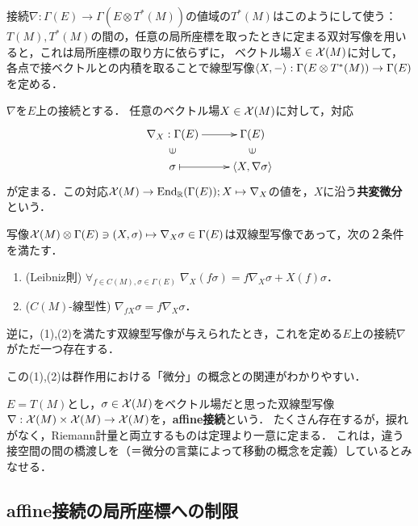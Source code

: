 \documentclass[uplatex,dvipdfmx]{jsreport}
\begin{document}
\begin{discussion}
    接続$\nabla:\Gamma(E)\to\Gamma(E\otimes T^*(M))$の値域の$T^*(M)$はこのようにして使う：
    $T(M),T^*(M)$の間の，任意の局所座標を取ったときに定まる双対写像を用いると，これは局所座標の取り方に依らずに，
    ベクトル場$X\in\mathcal{X}(M)$に対して，
    各点で接ベクトルとの内積を取ることで線型写像$\langle X,-\rangle:\Gamma(E\otimes T^*(M))\to\Gamma(E)$を定める．
\end{discussion}

\begin{definition}[接続の定める共変微分]
    $\nabla$を$E$上の接続とする．
    任意のベクトル場$X\in\mathcal{X}(M)$に対して，対応
    \[\xymatrix@R-2pc{
        \nabla_X:\Gamma(E)\ar[r]&\Gamma(E)\\
        \rotatebox[origin=c]{90}{$\in$}&\rotatebox[origin=c]{90}{$\in$}\\
        \sigma\ar@{|->}[r]&\brac{X,\nabla\sigma}
    }\]
    が定まる．この対応$\mathcal{X}(M)\to\mathrm{End}_{\mathbb{R}}(\Gamma(E));X\mapsto\nabla_X$の値を，$X$に沿う\textbf{共変微分}という．
\end{definition}

\begin{theorem}
    写像$\mathcal{X}(M)\otimes\Gamma(E)\ni(X,\sigma)\mapsto\nabla_X\sigma\in\Gamma(E)$は双線型写像であって，次の２条件を満たす．
    \begin{enumerate}
        \item (Leibniz則) $\forall_{f\in C(M),\sigma\in\Gamma(E)}\;\nabla_X(f\sigma)=f\nabla_X\sigma+X(f)\sigma$．
        \item ($C(M)$-線型性) $\nabla_{fX}\sigma=f\nabla_X\sigma$．
    \end{enumerate}
    逆に，(1),(2)を満たす双線型写像が与えられたとき，これを定める$E$上の接続$\nabla$がただ一つ存在する．
\end{theorem}
\begin{remarks}
    この(1),(2)は群作用における「微分」の概念との関連がわかりやすい．
\end{remarks}

\begin{example}
    $E=T(M)$とし，$\sigma\in\mathcal{X}(M)$をベクトル場だと思った双線型写像$\nabla:\mathcal{X}(M)\times\mathcal{X}(M)\to\mathcal{X}(M)$を，\textbf{affine接続}という．
    たくさん存在するが，捩れがなく，Riemann計量と両立するものは定理より一意に定まる．
    これは，違う接空間の間の橋渡しを（＝微分の言葉によって移動の概念を定義）しているとみなせる．
\end{example}

\subsection{affine接続の局所座標への制限}
\end{document}
